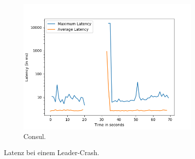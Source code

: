 \begin{figure}[t]
\begin{subfigure}[t]{0.45\textwidth}
		\includegraphics[width=\textwidth]{img/leader_crash_consul.png}
		\caption{Consul.}
	\end{subfigure}
	\caption{Latenz bei einem Leader-Crash.}
	\label{fig:leader-crash}
\end{figure}

